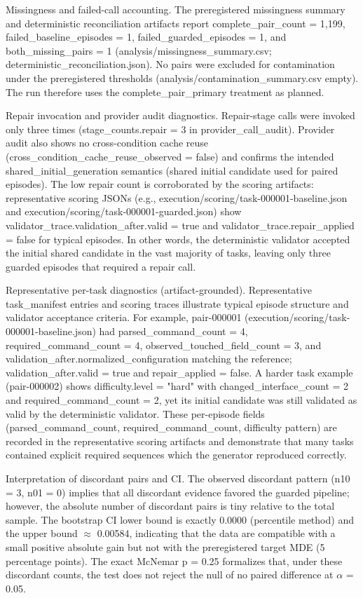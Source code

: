 \documentclass[conference]{IEEEtran}
\begin{document}
Missingness and failed-call accounting. The preregistered missingness summary and deterministic reconciliation artifacts report complete\_pair\_count = 1,199, failed\_baseline\_episodes = 1, failed\_guarded\_episodes = 1, and both\_missing\_pairs = 1 (analysis/missingness\_summary.csv; deterministic\_reconciliation.json). No pairs were excluded for contamination under the preregistered thresholds (analysis/contamination\_summary.csv empty). The run therefore uses the complete\_pair\_primary treatment as planned.

Repair invocation and provider audit diagnostics. Repair-stage calls were invoked only three times (stage\_counts.repair = 3 in provider\_call\_audit). Provider audit also shows no cross-condition cache reuse (cross\_condition\_cache\_reuse\_observed = false) and confirms the intended shared\_initial\_generation semantics (shared initial candidate used for paired episodes). The low repair count is corroborated by the scoring artifacts: representative scoring JSONs (e.g., execution/scoring/task-000001-baseline.json and execution/scoring/task-000001-guarded.json) show validator\_trace.validation\_after.valid = true and validator\_trace.repair\_applied = false for typical episodes. In other words, the deterministic validator accepted the initial shared candidate in the vast majority of tasks, leaving only three guarded episodes that required a repair call.

Representative per-task diagnostics (artifact-grounded). Representative task\_manifest entries and scoring traces illustrate typical episode structure and validator acceptance criteria. For example, pair-000001 (execution/scoring/task-000001-baseline.json) had parsed\_command\_count = 4, required\_command\_count = 4, observed\_touched\_field\_count = 3, and validation\_after.normalized\_configuration matching the reference; validation\_after.valid = true and repair\_applied = false. A harder task example (pair-000002) shows difficulty.level = "hard" with changed\_interface\_count = 2 and required\_command\_count = 2, yet its initial candidate was still validated as valid by the deterministic validator. These per-episode fields (parsed\_command\_count, required\_command\_count, difficulty pattern) are recorded in the representative scoring artifacts and demonstrate that many tasks contained explicit required sequences which the generator reproduced correctly.

Interpretation of discordant pairs and CI. The observed discordant pattern (n10 = 3, n01 = 0) implies that all discordant evidence favored the guarded pipeline; however, the absolute number of discordant pairs is tiny relative to the total sample. The bootstrap CI lower bound is exactly 0.0000 (percentile method) and the upper bound \ensuremath{\approx} 0.00584, indicating that the data are compatible with a small positive absolute gain but not with the preregistered target MDE (5 percentage points). The exact McNemar p = 0.25 formalizes that, under these discordant counts, the test does not reject the null of no paired difference at \ensuremath{\alpha} = 0.05.
\end{document}
